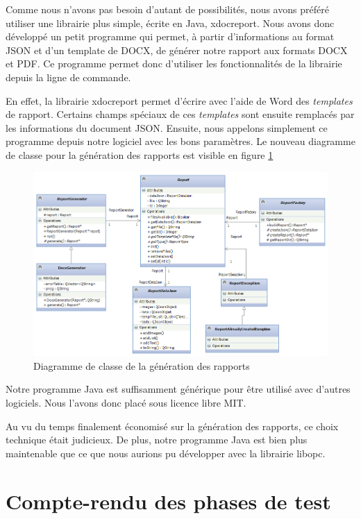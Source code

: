 \documentclass[a4paper,titlepage,french]{report}
\begin{document}
Comme nous n'avons pas besoin d'autant de possibilités, nous avons préféré utiliser une librairie plus simple, écrite en Java, xdocreport. %
Nous avons donc développé un petit programme qui permet, à partir d'informations au format JSON et d'un template de DOCX, de générer notre rapport aux formats DOCX et PDF.
Ce programme permet donc d'utiliser les fonctionnalités de la librairie depuis la ligne de commande.

En effet, la librairie xdocreport permet d'écrire avec l'aide de Word des \textit{templates} de rapport.
Certains champs spéciaux de ces \textit{templates} sont ensuite remplacés par les informations du document JSON.
Ensuite, nous appelons simplement ce programme depuis notre logiciel avec les bons paramètres.
Le nouveau diagramme de classe pour la génération des rapports est visible en figure \ref{fig:class-diagram-report-generation}

\begin{figure}[h]
 	\center
  	\includegraphics[scale=0.65]{class-diagram-report-generation.png}
  	\caption{Diagramme de classe de la génération des rapports}
	\label{fig:class-diagram-report-generation}
\end{figure}

Notre programme Java est suffisamment générique pour être utilisé avec d'autres logiciels.
Nous l'avons donc placé sous licence libre MIT. %

Au vu du temps finalement économisé sur la génération des rapports, ce choix technique était judicieux.
De plus, notre programme Java est bien plus maintenable que ce que nous aurions pu développer avec la librairie libopc.


\chapter{Compte-rendu des phases de test}
\end{document}
